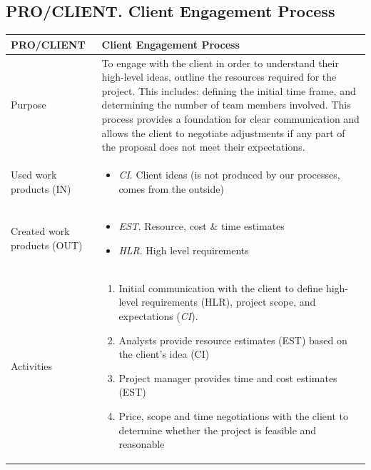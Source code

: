 \subsection{PRO/CLIENT. Client Engagement Process }
\begin{table}[h!]
\begin{tabular}{l|p{}}
\hline
\textbf{PRO/CLIENT}        & \textbf{Client Engagement Process} \\ \hline
Purpose &  To engage with the client in order to understand their high-level ideas, outline the resources required for the project. This includes: defining the initial time frame, and determining the number of team members involved. This process provides a foundation for clear communication and allows the client to negotiate adjustments if any part of the proposal does not meet their expectations.  \\ \hline
Used work products (IN)   &      
\begin{itemize}
    \item \textit{CI}. Client ideas (is not produced by our processes, comes from the outside)
\end{itemize}
\\ \hline
Created work products (OUT) &     
\begin{itemize}
    \item \textit{EST}. Resource, cost \& time estimates
    \item \textit{HLR}. High level requirements 
\end{itemize}
\\ \hline
Activities            &   
\begin{enumerate}
    \item Initial communication with the client to define high-level requirements (HLR), project scope, and expectations (\textit{CI}).
    \item Analysts provide resource estimates (EST) based on the client's idea (CI)
    \item Project manager provides time and cost estimates (EST)
    \item Price, scope and time negotiations with the client to determine whether the project is feasible and reasonable
     
\end{enumerate}
\\ \hline

\end{tabular}

\label{pro/sign}
\end{table}

